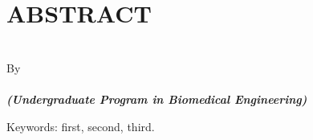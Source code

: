 \clearpage
\chapter*{ABSTRACT}

\begin{center}
	
	\renewcommand{\baselinestretch}{1}
	\large{\bfseries \MakeUppercase{\thetitle}}
	\\[\baselineskip]
	
	\normalsize{By\\}
	\large{ 
		\bfseries \theauthor\\
		\itshape (Undergraduate Program in Biomedical Engineering)
	}
	\\[2\baselineskip]
	
\end{center}

\begin{itshape}

\blindtext

Keywords: first, second, third.

\end{itshape}

\clearpage

